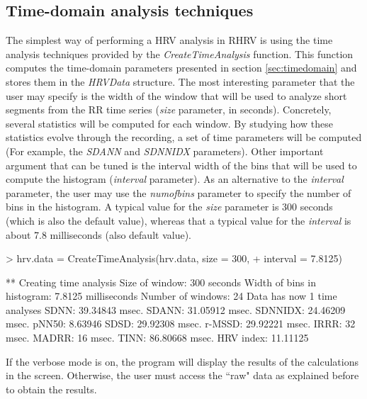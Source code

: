 \documentclass[12pt,lot, lof]{puthesis}
\begin{document}
\subsection{Time-domain analysis techniques\label{sec:quickTime}}
The simplest way of performing a \gls{HRV} analysis in RHRV is using the time 
analysis techniques 
provided by the \textit{CreateTimeAnalysis} function. This function computes 
the time-domain
parameters presented in section \ref{sec:timedomain} and stores them in the 
\textit{HRVData} structure. The most interesting parameter that the user may 
specify is the width of the window that
will be used to analyze short segments from the RR time series (\textit{size} 
parameter, in seconds). Concretely, several statistics will be computed for 
each window. By studying how these statistics
evolve through the recording, a set of time parameters will be computed (For 
example, the \textit{SDANN}
and \textit{SDNNIDX} parameters). Other important argument that can be tuned is 
the interval width of the bins that will be used to compute the histogram 
(\textit{interval} parameter). As an alternative to the \textit{interval} 
parameter, the user may use the 
\textit{numofbins} parameter to specify the number of bins in the histogram. A 
typical value for the \textit{size} parameter is 300 seconds (which is also the 
default value), whereas that a typical value for the \textit{interval} is about 
7.8 milliseconds (also default value).

\begin{Schunk}
\begin{Sinput}
> hrv.data = CreateTimeAnalysis(hrv.data, size = 300,
+     		interval = 7.8125)
\end{Sinput}
\begin{Soutput}
** Creating time analysis
   Size of window: 300 seconds 
   Width of bins in histogram: 7.8125 milliseconds 
   Number of windows: 24 
   Data has now 1 time analyses
      SDNN: 39.34843 msec. 
      SDANN: 31.05912 msec. 
      SDNNIDX: 24.46209 msec. 
      pNN50: 8.63946 %
      SDSD: 29.92308 msec.
      r-MSSD: 29.92221 msec.
      IRRR: 32 msec.
      MADRR: 16 msec.
      TINN: 86.80668 msec.
      HRV index: 11.11125 
\end{Soutput}
\end{Schunk}
If the verbose mode is on, the program will display the results of the 
calculations in the screen. Otherwise, the user must access the ``raw" data as 
explained before to obtain the results.\\
\end{document}
